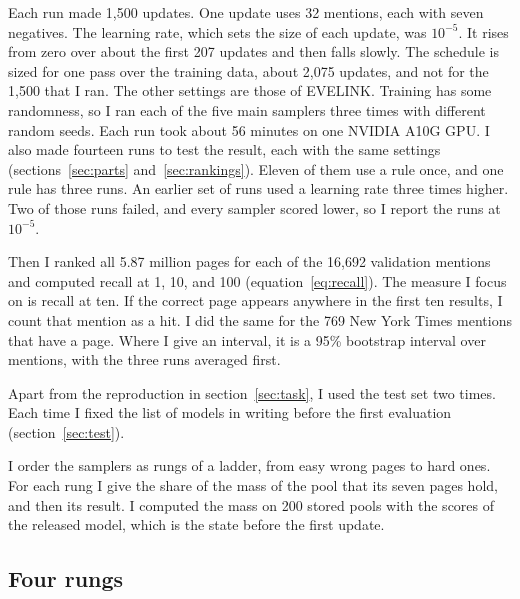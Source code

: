 \documentclass[11pt]{article}
\theoremstyle{definition}
\begin{document}
Each run made 1,500 updates. One update uses 32 mentions, each with seven negatives. The learning rate, which sets the size of each update, was $10^{-5}$. It rises from zero over about the first 207 updates and then falls slowly. The schedule is sized for one pass over the training data, about 2,075 updates, and not for the 1,500 that I ran. The other settings are those of EVELINK. Training has some randomness, so I ran each of the five main samplers three times with different random seeds. Each run took about 56 minutes on one NVIDIA A10G GPU. I also made fourteen runs to test the result, each with the same settings (sections~\ref{sec:parts} and~\ref{sec:rankings}). Eleven of them use a rule once, and one rule has three runs. An earlier set of runs used a learning rate three times higher. Two of those runs failed, and every sampler scored lower, so I report the runs at $10^{-5}$.

Then I ranked all 5.87 million pages for each of the 16,692 validation mentions and computed recall at 1, 10, and 100 (equation~\ref{eq:recall}). The measure I focus on is recall at ten. If the correct page appears anywhere in the first ten results, I count that mention as a hit. I did the same for the 769 New York Times mentions that have a page. Where I give an interval, it is a 95\% bootstrap interval over mentions, with the three runs averaged first.

Apart from the reproduction in section~\ref{sec:task}, I used the test set two times. Each time I fixed the list of models in writing before the first evaluation (section~\ref{sec:test}).

I order the samplers as rungs of a ladder, from easy wrong pages to hard ones. For each rung I give the share of the mass of the pool that its seven pages hold, and then its result. I computed the mass on 200 stored pools with the scores of the released model, which is the state before the first update.

\subsection{Four rungs}
\label{sec:rungs}
\end{document}
